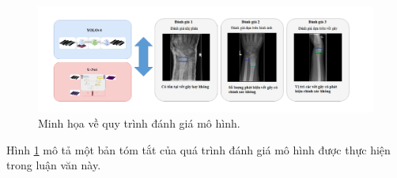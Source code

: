 \documentclass[../the.tex]{subfiles}
\begin{document}
{\begin{itemize}
	\end{itemize}

	\begin{figure}[ht!]
		\centering
		\includegraphics[width=1\textwidth]{images/eval.png}
		\caption{Minh họa về quy trình đánh giá mô hình.}
		\label{fig:model_eval}
	\end{figure}

	Hình \ref{fig:model_eval} mô tả một bản tóm tắt của quá trình đánh giá mô hình được thực hiện trong luận văn này.



}
\end{document}

